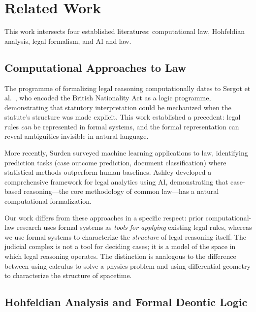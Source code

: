 \documentclass[12pt]{article}
\theoremstyle{definition}
\theoremstyle{remark}
\begin{document}
\section{Related Work}
\label{sec:related}

This work intersects four established literatures: computational law, Hohfeldian analysis, legal formalism, and AI and law.

\subsection{Computational Approaches to Law}

The programme of formalizing legal reasoning computationally dates to Sergot et al.\ \cite{sergot1986}, who encoded the British Nationality Act as a logic programme, demonstrating that statutory interpretation could be mechanized when the statute's structure was made explicit.  This work established a precedent: legal rules \emph{can} be represented in formal systems, and the formal representation can reveal ambiguities invisible in natural language.

More recently, Surden \cite{surden2014} surveyed machine learning applications to law, identifying prediction tasks (case outcome prediction, document classification) where statistical methods outperform human baselines.  Ashley \cite{ashley2017} developed a comprehensive framework for legal analytics using AI, demonstrating that case-based reasoning---the core methodology of common law---has a natural computational formalization.

Our work differs from these approaches in a specific respect: prior computational-law research uses formal systems as \emph{tools for applying} existing legal rules, whereas we use formal systems to characterize the \emph{structure} of legal reasoning itself.  The judicial complex is not a tool for deciding cases; it is a model of the space in which legal reasoning operates.  The distinction is analogous to the difference between using calculus to solve a physics problem and using differential geometry to characterize the structure of spacetime.

\subsection{Hohfeldian Analysis and Formal Deontic Logic}
\end{document}
